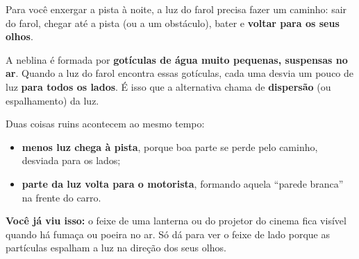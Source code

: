 \begin{enunciado}

\end{enunciado}


\begin{ideia}
Para você enxergar a pista à noite, a luz do farol precisa fazer um caminho: sair do farol, chegar até a pista (ou a um
obstáculo), bater e \textbf{voltar para os seus olhos}.

A neblina é formada por \textbf{gotículas de água muito pequenas, suspensas no ar}. Quando a luz do farol encontra essas
gotículas, cada uma desvia um pouco de luz \textbf{para todos os lados}. É isso que a alternativa chama de
\textbf{dispersão} (ou espalhamento) da luz.

Duas coisas ruins acontecem ao mesmo tempo:
\begin{itemize}
  \item \textbf{menos luz chega à pista}, porque boa parte se perde pelo caminho, desviada para os lados;
  \item \textbf{parte da luz volta para o motorista}, formando aquela ``parede branca'' na frente do carro.
\end{itemize}

\textbf{Você já viu isso:} o feixe de uma lanterna ou do projetor do cinema fica visível quando há fumaça ou poeira no ar.
Só dá para ver o feixe de lado porque as partículas espalham a luz na direção dos seus olhos.

\begin{center}
\end{center}
\end{ideia}

